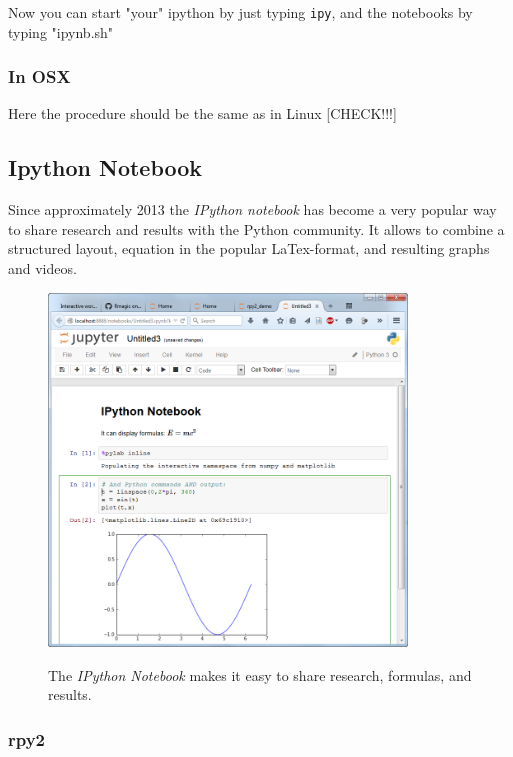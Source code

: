 Now you can start "your" ipython by just typing \lstinline{ipy}, and the notebooks by typing "ipynb.sh"

\subsubsection{In OSX}

Here the procedure should be the same as in Linux [CHECK!!!]

\subsection{Ipython Notebook}

Since approximately 2013 the \emph{IPython notebook} has become a very popular way to share research and results with the Python community. It allows to combine a structured layout, equation in the popular LaTex-format, and resulting graphs and videos.

\begin{figure}
  \centering
  \includegraphics[width=0.85\textwidth]{../Images/ipython-notebook.png}\\
  \caption{The \emph{IPython Notebook} makes it easy to share research, formulas, and results.}
\end{figure}

\subsubsection{rpy2}

